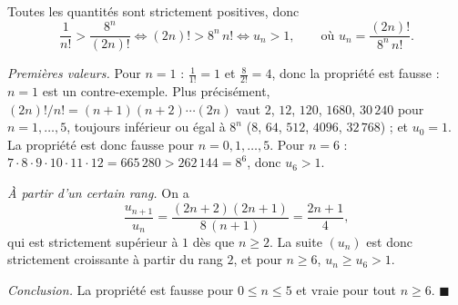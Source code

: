 Toutes les quantités sont strictement positives, donc
\[
\frac{1}{n!} > \frac{8^n}{(2n)!} \iff (2n)! > 8^n\, n! \iff u_n > 1,
\qquad\text{où } u_n = \frac{(2n)!}{8^n\, n!}.
\]

\emph{Premières valeurs.} Pour $n = 1$ : $\frac{1}{1!} = 1$ et
$\frac{8}{2!} = 4$, donc la propriété est fausse : $n = 1$ est un
contre-exemple. Plus précisément, $(2n)!/n! = (n+1)(n+2)\cdots(2n)$ vaut
$2$, $12$, $120$, $1680$, $30\,240$ pour $n = 1, \ldots, 5$, toujours inférieur
ou égal à $8^n$ ($8$, $64$, $512$, $4096$, $32\,768$) ; et $u_0 = 1$. La
propriété est donc fausse pour $n = 0, 1, \ldots, 5$. Pour $n = 6$ :
$7 \cdot 8 \cdot 9 \cdot 10 \cdot 11 \cdot 12 = 665\,280 > 262\,144 = 8^6$,
donc $u_6 > 1$.

\emph{À partir d'un certain rang.} On a
\[
\frac{u_{n+1}}{u_n} = \frac{(2n+2)(2n+1)}{8\,(n+1)} = \frac{2n+1}{4},
\]
qui est strictement supérieur à $1$ dès que $n \geqslant 2$. La suite $(u_n)$
est donc strictement croissante à partir du rang $2$, et pour $n \geqslant 6$,
$u_n \geqslant u_6 > 1$.

\emph{Conclusion.} La propriété est fausse pour $0 \leqslant n \leqslant 5$
et vraie pour tout $n \geqslant 6$. \hfill $\blacksquare$

